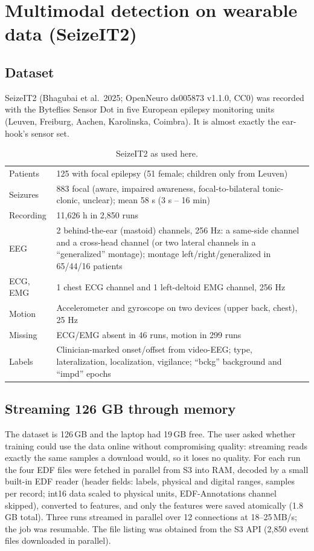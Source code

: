 \section{Multimodal detection on wearable data (SeizeIT2)}
\label{sec:seizeit2}

\subsection{Dataset}

SeizeIT2 (Bhagubai et al.\ 2025; OpenNeuro ds005873 v1.1.0, CC0) was recorded with the Byteflies Sensor Dot in five European epilepsy monitoring units (Leuven, Freiburg, Aachen, Karolinska, Coimbra). It is almost exactly the ear-hook's sensor set.

\begin{table}[H]
\centering\small
\caption{SeizeIT2 as used here.}
\begin{tabularx}{\linewidth}{@{}l L@{}}
\toprule
Patients & 125 with focal epilepsy (51 female; children only from Leuven) \\
Seizures & 883 focal (aware, impaired awareness, focal-to-bilateral tonic-clonic, unclear); mean 58 s (3 s -- 16 min) \\
Recording & 11,626 h in 2,850 runs \\
EEG & 2 behind-the-ear (mastoid) channels, 256 Hz: a same-side channel and a cross-head channel (or two lateral channels in a ``generalized'' montage); montage left/right/generalized in 65/44/16 patients \\
ECG, EMG & 1 chest ECG channel and 1 left-deltoid EMG channel, 256 Hz \\
Motion & Accelerometer and gyroscope on two devices (upper back, chest), 25 Hz \\
Missing & ECG/EMG absent in 46 runs, motion in 299 runs \\
Labels & Clinician-marked onset/offset from video-EEG; type, lateralization, localization, vigilance; ``bckg'' background and ``impd'' epochs \\
\bottomrule
\end{tabularx}
\end{table}

\subsection{Streaming 126 GB through memory}

The dataset is 126\,GB and the laptop had 19\,GB free. The user asked whether training could use the data online without compromising quality: streaming reads exactly the same samples a download would, so it loses no quality. For each run the four EDF files were fetched in parallel from S3 into RAM, decoded by a small built-in EDF reader (header fields: labels, physical and digital ranges, samples per record; int16 data scaled to physical units, EDF-Annotations channel skipped), converted to features, and only the features were saved atomically (1.8\,GB total). Three runs streamed in parallel over 12 connections at 18--25\,MB/s; the job was resumable. The file listing was obtained from the S3 API (2,850 event files downloaded in parallel).

